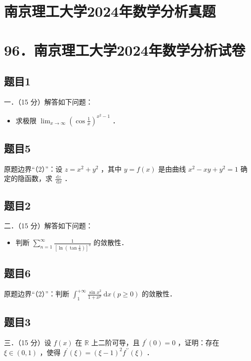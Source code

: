 \documentclass{article}
\begin{document}
\section*{南京理工大学2024年数学分析真题}
\section*{96．南京理工大学2024年数学分析试卷}

\subsection{题目1}
一．（15 分）解答如下问题：

\begin{itemize}
  \item[（1）] 求极限 \(\lim _{x \rightarrow \infty}\left(\cos \frac{1}{x}\right)^{x^{2}-1}\) ．
\end{itemize}

\subsection{题目5}
原题边界“（2）”：设 \(z=x^{2}+y^{2}\) ，其中 \(y=f(x)\) 是由曲线 \(x^{2}-x y+y^{2}=1\) 确定的隐函数，求 \(\frac{\mathrm{d} z}{\mathrm{~d} x}\) ．

\subsection{题目2}
二．（15 分）解答如下问题：

\begin{itemize}
  \item[（1）] 判断 \(\sum_{n=1}^{\infty} \frac{1}{\left[\ln \left(\tan \frac{1}{n}\right)\right]^{3}}\) 的敛散性．
\end{itemize}

\subsection{题目6}
原题边界“（2）”：判断 \(\int_{1}^{+\infty} \frac{\sin x^{2}}{1+x^{p}} \mathrm{~d} x(p \geq 0)\) 的敛散性．

\subsection{题目3}
三．（15 分）设 \(f(x)\) 在 \(\mathbb{R}\) 上二阶可导，且 \(f^{\prime}(0)=0\) ，证明：存在 \(\xi \in(0,1)\) ，使得 \(f^{\prime}(\xi)=(\xi-1)^{2} f^{\prime \prime}(\xi)\) ．
\end{document}
